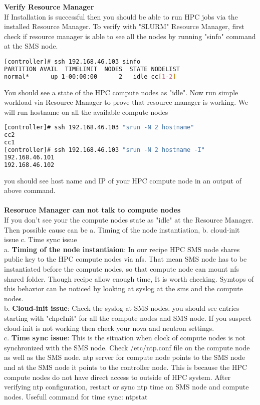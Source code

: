 \textbf{Verify Resource Manager}\\
If Installation is successful then you should be able to run HPC jobs via the installed Resource Manager. To verify with "SLURM" Resource Manager, first check if resource manager is able to see all the nodes by running "sinfo" command at the SMS node. 
\begin{lstlisting}[language=bash,keywords={},upquote=true]
[controller]# ssh 192.168.46.103 sinfo
PARTITION AVAIL  TIMELIMIT  NODES  STATE NODELIST
normal*      up 1-00:00:00      2   idle cc[1-2]
\end{lstlisting}
You should see a state of the HPC compute nodes as "idle". Now run simple workload via Resource Manager to prove that resource manager is working. We will run hostname on all the available compute nodes
\begin{lstlisting}[language=bash,keywords={},upquote=true]
[controller]# ssh 192.168.46.103 "srun -N 2 hostname"
cc2
cc1
[controller]# ssh 192.168.46.103 "srun -N 2 hostname -I"
192.168.46.101 
192.168.46.102
\end{lstlisting}
you should see host name and IP of your HPC compute node in an output of above command. \\
\\
\textbf{Resoruce Manager can not talk to compute nodes}\\
If you don't see your the compute nodes state as "idle" at the Resource Manager. Then possible cause can be a. Timing of the node instantiation, b. cloud-init issue c. Time sync issue \\
a. \textbf{Timing of the node instantiaion}: In our recipe HPC SMS node shares public key to the HPC compute nodes via nfs. That mean SMS node has to be instantiated before the compute nodes, so that compute node can mount nfs shared folder. Though recipe allow enough time, It is worth checking. Symtops of this behavior can be noticed by looking at syslog at the sms and the compute nodes.    \\
b. \textbf{Cloud-init issue}: Check the syslog at SMS nodes. you should see entries starting with "chpcInit" for all the compute nodes and SMS node. If you suspect cloud-init is not working then check your nova and neutron settings.\\
c. \textbf{Time sync issue}: This is the situation when clock of compute nodes is not synchronized with the SMS node. Check /etc/ntp.conf file on the compute node as well as the SMS node. ntp server for compute node points to the SMS node and at the SMS node it points to the controller node. This is because the HPC compute nodes do not have direct access to outside of HPC system. After verifying ntp configuration, restart or sync ntp time on SMS node and compute nodes. Usefull command for time sync: ntpstat\\


	
